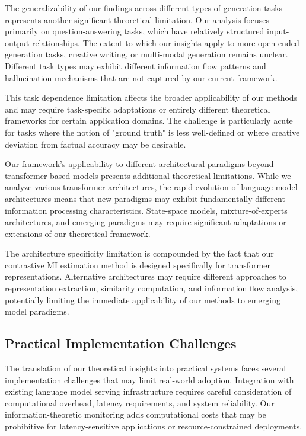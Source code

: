 The generalizability of our findings across different types of generation tasks represents another significant theoretical limitation. Our analysis focuses primarily on question-answering tasks, which have relatively structured input-output relationships. The extent to which our insights apply to more open-ended generation tasks, creative writing, or multi-modal generation remains unclear. Different task types may exhibit different information flow patterns and hallucination mechanisms that are not captured by our current framework.

This task dependence limitation affects the broader applicability of our methods and may require task-specific adaptations or entirely different theoretical frameworks for certain application domains. The challenge is particularly acute for tasks where the notion of "ground truth" is less well-defined or where creative deviation from factual accuracy may be desirable.

Our framework's applicability to different architectural paradigms beyond transformer-based models presents additional theoretical limitations. While we analyze various transformer architectures, the rapid evolution of language model architectures means that new paradigms may exhibit fundamentally different information processing characteristics. State-space models, mixture-of-experts architectures, and emerging paradigms may require significant adaptations or extensions of our theoretical framework.

The architecture specificity limitation is compounded by the fact that our contrastive MI estimation method is designed specifically for transformer representations. Alternative architectures may require different approaches to representation extraction, similarity computation, and information flow analysis, potentially limiting the immediate applicability of our methods to emerging model paradigms.

\subsection{Practical Implementation Challenges}

The translation of our theoretical insights into practical systems faces several implementation challenges that may limit real-world adoption. Integration with existing language model serving infrastructure requires careful consideration of computational overhead, latency requirements, and system reliability. Our information-theoretic monitoring adds computational costs that may be prohibitive for latency-sensitive applications or resource-constrained deployments.

